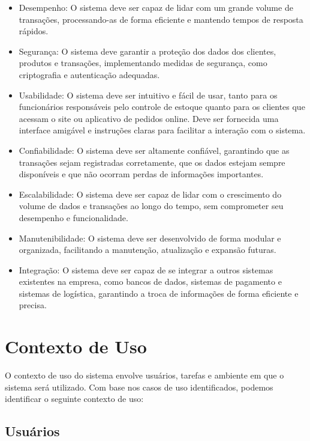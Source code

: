 \documentclass[
	12pt,				%
	openright,			%
	twoside,			%
	a4paper,			%
	english,			%
	brazil				%
	]{abntex2}
\begin{document}
\begin{itemize}
	\item Desempenho: O sistema deve ser capaz de lidar com um grande volume de transações, processando-as de forma eficiente e mantendo tempos de resposta rápidos.
	\item Segurança: O sistema deve garantir a proteção dos dados dos clientes, produtos e transações, implementando medidas de segurança, como criptografia e autenticação adequadas.
	\item Usabilidade: O sistema deve ser intuitivo e fácil de usar, tanto para os funcionários responsáveis pelo controle de estoque quanto para os clientes que acessam o site ou aplicativo de pedidos online. Deve ser fornecida uma interface amigável e instruções claras para facilitar a interação com o sistema.
	\item Confiabilidade: O sistema deve ser altamente confiável, garantindo que as transações sejam registradas corretamente, que os dados estejam sempre disponíveis e que não ocorram perdas de informações importantes.
	\item Escalabilidade: O sistema deve ser capaz de lidar com o crescimento do volume de dados e transações ao longo do tempo, sem comprometer seu desempenho e funcionalidade.
	\item Manutenibilidade: O sistema deve ser desenvolvido de forma modular e organizada, facilitando a manutenção, atualização e expansão futuras.
	\item Integração: O sistema deve ser capaz de se integrar a outros sistemas existentes na empresa, como bancos de dados, sistemas de pagamento e sistemas de logística, garantindo a troca de informações de forma eficiente e precisa.
\end{itemize}

\chapter{Contexto de Uso}\label{contex_de_uso}

O contexto de uso do sistema envolve usuários, tarefas e ambiente em que o sistema será utilizado. Com base nos casos de uso identificados, podemos identificar o seguinte contexto de uso:

\section{Usuários}\label{usuarios_contex_uso}
\end{document}
